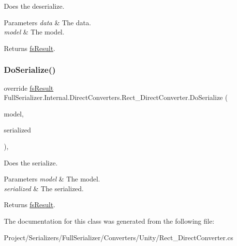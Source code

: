 Does the deserialize. 


\begin{DoxyParams}{Parameters}
{\em data} & The data.\\
\hline
{\em model} & The model.\\
\hline
\end{DoxyParams}
\begin{DoxyReturn}{Returns}
\hyperlink{struct_full_serializer_1_1fs_result}{fs\+Result}.
\end{DoxyReturn}
\mbox{\label{class_full_serializer_1_1_internal_1_1_direct_converters_1_1_rect___direct_converter_a23a39057a3eca893d06cb2808b3c7747}} 
\subsubsection{\texorpdfstring{Do\+Serialize()}{DoSerialize()}}
{\footnotesize\ttfamily override \hyperlink{struct_full_serializer_1_1fs_result}{fs\+Result} Full\+Serializer.\+Internal.\+Direct\+Converters.\+Rect\+\_\+\+Direct\+Converter.\+Do\+Serialize (\begin{DoxyParamCaption}\item[{Rect}]{model,  }\item[{Dictionary$<$ string, \hyperlink{class_full_serializer_1_1fs_data}{fs\+Data} $>$}]{serialized }\end{DoxyParamCaption})\hspace{0.3cm}{\ttfamily [inline]}, {\ttfamily [protected]}}



Does the serialize. 


\begin{DoxyParams}{Parameters}
{\em model} & The model.\\
\hline
{\em serialized} & The serialized.\\
\hline
\end{DoxyParams}
\begin{DoxyReturn}{Returns}
\hyperlink{struct_full_serializer_1_1fs_result}{fs\+Result}.
\end{DoxyReturn}


The documentation for this class was generated from the following file\+:\begin{DoxyCompactItemize}
\item 
Project/\+Serializers/\+Full\+Serializer/\+Converters/\+Unity/Rect\+\_\+\+Direct\+Converter.\+cs\end{DoxyCompactItemize}
